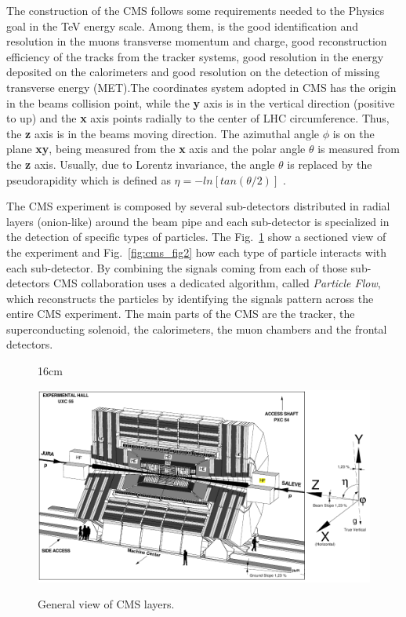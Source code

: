 The construction of the CMS follows some requirements needed to the Physics goal in the TeV energy scale. Among them, is the good identification and resolution in the muons transverse momentum and charge, good reconstruction efficiency of the tracks from the tracker systems, good resolution in the energy deposited on the calorimeters and good resolution on the detection of missing transverse energy (MET).The coordinates system adopted in CMS has the origin in the beams collision point, while the 
\textbf{y} axis is in the vertical direction (positive to up) and the \textbf{x} axis points radially to the center of LHC circumference. Thus, the \textbf{z} axis is in the beams moving direction. The azimuthal angle $\phi$ is on the plane \textbf{xy}, being measured from the \textbf{x} axis and the polar angle $\theta$ is measured from the \textbf{z} axis. Usually, due to Lorentz invariance, the angle $\theta$ is replaced by the pseudorapidity which is defined as $\eta=-ln[tan(\theta/2)]$ \cite{bib:lhc-guide,bib:cms-page}.

The CMS experiment is composed by several sub-detectors distributed in radial layers (onion-like) around the beam pipe and each sub-detector is specialized in the detection of specific types of particles. The Fig.~\ref{fig:cms_fig1} show a sectioned view of the experiment and Fig.~\ref{fig:cms_fig2} how each type of particle interacts with each sub-detector. By combining the signals coming from each of those sub-detectors CMS collaboration uses a dedicated algorithm, called \textit{Particle Flow}, which reconstructs the particles by identifying the signals pattern across the entire CMS experiment. The main parts of the CMS are the tracker, the superconducting solenoid, the calorimeters, the muon chambers and the frontal detectors.

\begin{figure}[htbp]{16cm}
\caption{General view of CMS layers.}
\centering
\includegraphics[scale=0.9,angle=90]{ChapterCMS/figs/cms_coordinates_system.png}
\label{fig:cms_fig1}
\end{figure}

